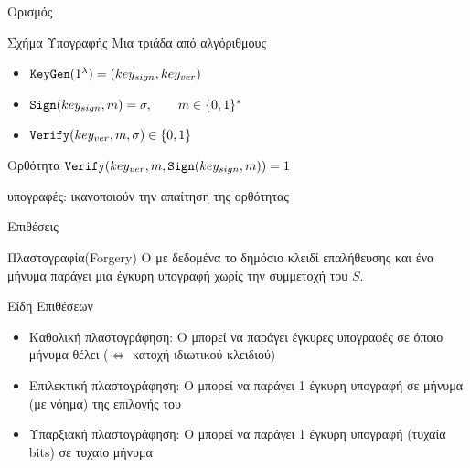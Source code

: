 \documentclass{beamer}
\begin{document}
\begin{frame}{Ορισμός}
\begin{block}{Σχήμα Υπογραφής}
Μια τριάδα από αλγόριθμους
\begin{itemize}
\item $\mathtt{KeyGen}(1^\lambda) = (key_{sign},key_{ver})$
\pause
\item $\mathtt{Sign}(key_{sign}, m) = \sigma, \quad\quad m \in \{0,1\}^*$
\pause
\item $\mathtt{Verify}(key_{ver}, m, \sigma) \in \{0,1\}$
\end{itemize}
\end{block}
\pause
\begin{block}{Ορθότητα}
$\mathtt{Verify}(key_{ver}, m, \mathtt{Sign}(key_{sign}, m))=1$
\end{block}
\pause
{} υπογραφές: ικανοποιούν την απαίτηση της ορθότητας

\end{frame}

\begin{frame}{Επιθέσεις}
\begin{block}{Πλαστογραφία(Forgery)}
O \adv με δεδομένα το δημόσιο κλειδί επαλήθευσης και ένα μήνυμα παράγει μια έγκυρη υπογραφή χωρίς την συμμετοχή του $S$. 
\end{block}
\pause
\begin{block}{\alert{Είδη Επιθέσεων}}
\begin{itemize}
\item \alert{Καθολική πλαστογράφηση}: Ο \adv μπορεί να παράγει έγκυρες υπογραφές σε όποιο μήνυμα θέλει ($\Leftrightarrow$ κατοχή ιδιωτικού κλειδιού)
\pause
\item \alert{Επιλεκτική πλαστογράφηση}: Ο \adv μπορεί να παράγει 1 έγκυρη υπογραφή σε μήνυμα (με νόημα) της επιλογής του   
\pause
\item \alert{Υπαρξιακή πλαστογράφηση}: Ο \adv μπορεί να παράγει 1 έγκυρη υπογραφή (τυχαία bits) σε τυχαίο μήνυμα
\end{itemize}
\end{block}
\end{frame}
\end{document}
